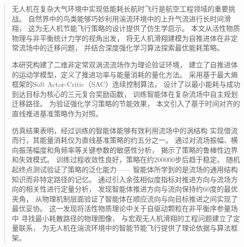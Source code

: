 ﻿%

\begin{abstract}
无人机在复杂大气环境中实现低能耗长航时飞行是航空工程领域的重要挑战。
自然界中的鸟类能够巧妙利用湍流环境中的上升气流进行长时间滑翔，
这为无人机节能飞行策略的设计提供了仿生学启示。
本文从活性物质物理与非平衡统计力学的视角出发，
将无人机滑翔建模为自推进体在非定常流场中的迁移问题，
并结合深度强化学习算法探索最优能耗策略。

本研究构建了二维非定常双涡流流场作为理论验证环境，
建立了自推进体的运动学模型，定义了推进功率与能量消耗的量化方法。
采用基于最大熵框架的Soft Actor-Critic（SAC）连续控制算法，
设计了以最小能耗与成功到达目标为核心的三元复合奖励函数，
训练智能体在复杂流场中自主规划迁移路径。
为验证强化学习策略的节能效果，
本文引入了基于时间对齐的直线推进基准策略作为对照。

仿真结果表明，经过训练的智能体能够有效利用流场中的涡结构
实现借流而行，其能量消耗仅为直线基准策略的约五分之一。
通过对流场振幅、横向振荡幅度和角频率等关键参数的敏感性分析，
揭示了策略的鲁棒性边界和失效模式。
训练过程收敛性良好，策略在约200000步后趋于稳定。
随机起终点测试验证了策略的泛化能力——
智能体所学到的是流场的通用结构知识而非特定路径的记忆。
通过引入余弦相似度指标对推进方向与流场方向的相关性进行定量分析，
发现智能体推进方向与流向保持约60度的最优夹角，
从物理机制层面验证了智能体在顺应流向与向目标推进之间实现了最优妥协。
这一发现将活性物质理论中关于自驱动颗粒在非平衡序参量场中
寻找最小耗散路径的物理图像，
与宏观无人机滑翔的工程问题建立了定量联系，
为无人机在湍流环境中的智能节能飞行提供了理论依据与算法框架。

\end{abstract}


